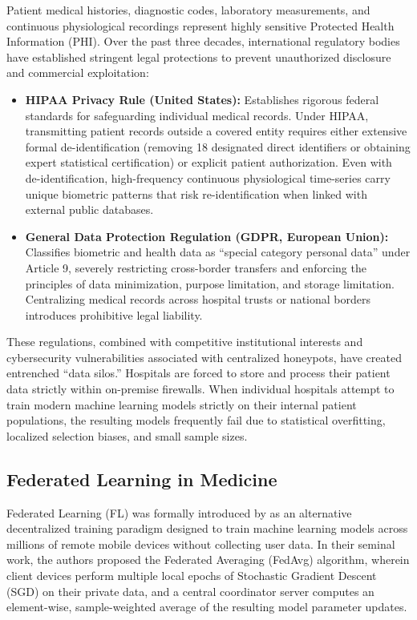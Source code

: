 Patient medical histories, diagnostic codes, laboratory measurements, and continuous physiological recordings represent highly sensitive Protected Health Information (PHI). Over the past three decades, international regulatory bodies have established stringent legal protections to prevent unauthorized disclosure and commercial exploitation:
\begin{itemize}
    \item \textbf{HIPAA Privacy Rule (United States):} Establishes rigorous federal standards for safeguarding individual medical records. Under HIPAA, transmitting patient records outside a covered entity requires either extensive formal de-identification (removing 18 designated direct identifiers or obtaining expert statistical certification) or explicit patient authorization. Even with de-identification, high-frequency continuous physiological time-series carry unique biometric patterns that risk re-identification when linked with external public databases.
    \item \textbf{General Data Protection Regulation (GDPR, European Union):} Classifies biometric and health data as ``special category personal data'' under Article 9, severely restricting cross-border transfers and enforcing the principles of data minimization, purpose limitation, and storage limitation. Centralizing medical records across hospital trusts or national borders introduces prohibitive legal liability.
\end{itemize}
These regulations, combined with competitive institutional interests and cybersecurity vulnerabilities associated with centralized honeypots, have created entrenched ``data silos.'' Hospitals are forced to store and process their patient data strictly within on-premise firewalls. When individual hospitals attempt to train modern machine learning models strictly on their internal patient populations, the resulting models frequently fail due to statistical overfitting, localized selection biases, and small sample sizes.

\subsection{Federated Learning in Medicine}
\label{subsec:fl_in_medicine}

Federated Learning (FL) was formally introduced by \citet{mcmahan2017communication} as an alternative decentralized training paradigm designed to train machine learning models across millions of remote mobile devices without collecting user data. In their seminal work, the authors proposed the Federated Averaging (FedAvg) algorithm, wherein client devices perform multiple local epochs of Stochastic Gradient Descent (SGD) on their private data, and a central coordinator server computes an element-wise, sample-weighted average of the resulting model parameter updates.

